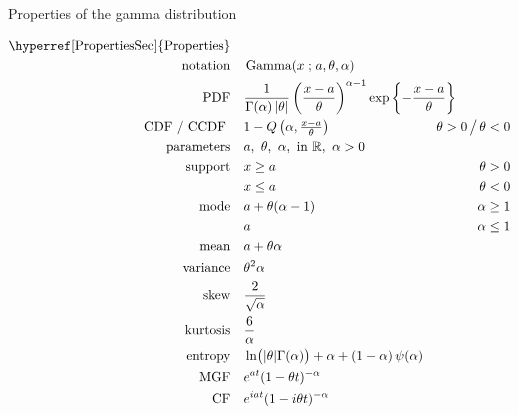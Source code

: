 

\begin{table*}[tp!]

\caption[Gamma distribution -- Properties]{Properties of the gamma distribution}

\begin{align*}
\text{\hyperref[PropertiesSec]{Properties}}  \quad& \\
\text{notation} \quad &  \op{Gamma}(x\given a, \theta, \alpha) 	\checked
\\
\text{PDF} \quad &
\frac{1}{\Gamma(\alpha)\left|\theta\right|} 
\left(\frac{x-a}{\theta}\right)^{\alpha  -1}
\exp \left\{
-  \frac{x-a}{\theta}
\right\}
\checked \hspace{-8em}						
\\ 
\text{CDF / CCDF } \quad  &    1-Q\left(\alpha, \tfrac{x - a }{\theta} \right) \checked
& \theta>0 \, \big/ \,  \theta<0
\\
\text{parameters}\quad &   a,\ \theta,\ \alpha,\  \text{in } \Real, \ \alpha>0
\\
\text{support} \quad &     x \geq a &  \theta > 0
\\
&   x\leq a  &  \theta < 0 
\\
\text{mode} \quad&   a+ \theta (\alpha-1)
& \alpha   \geq 1 \checked
\\ & a & \alpha   \le 1 \checked
\\
\text{mean} \quad& a  + \theta \alpha \checked
\\
\text{variance}  \quad&   \theta^2 \alpha \checked & 
\\
\text{skew} \quad  &  \frac{2}{\sqrt{\alpha}}  \checked
\\
\text{kurtosis} \quad  &  \frac{6}{\alpha} \checked
\\
\text{entropy} \quad& 
\ln \bigl(|\theta| \Gamma(\alpha) \bigr)+\alpha + \left( 1 - \alpha\right) \psi(\alpha) \checked
\\
\text{MGF} \quad  &   e^{a t} (1- \theta t)^{-\alpha}	\checked
\\
\text{CF} \quad  &  e^{i a t} (1- i \theta t)^{-\alpha}		\checked
\end{align*}
\end{table*}



